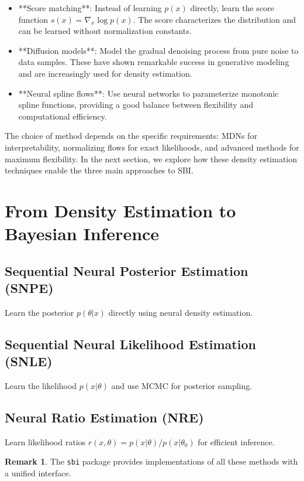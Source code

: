 \documentclass[11pt,a4paper]{article}
\theoremstyle{definition}
\newtheorem*{remark}{Remark}
\begin{document}
\begin{itemize}
    \item **Score matching**: Instead of learning $p(x)$ directly, learn the score function $s(x) = \nabla_x \log p(x)$. The score characterizes the distribution and can be learned without normalization constants.
    
    \item **Diffusion models**: Model the gradual denoising process from pure noise to data samples. These have shown remarkable success in generative modeling and are increasingly used for density estimation.
    
    \item **Neural spline flows**: Use neural networks to parameterize monotonic spline functions, providing a good balance between flexibility and computational efficiency.
\end{itemize}

The choice of method depends on the specific requirements: MDNs for interpretability, normalizing flows for exact likelihoods, and advanced methods for maximum flexibility. In the next section, we explore how these density estimation techniques enable the three main approaches to SBI.

\section{From Density Estimation to Bayesian Inference}

\subsection{Sequential Neural Posterior Estimation (SNPE)}
Learn the posterior $p(\theta|x)$ directly using neural density estimation.

\subsection{Sequential Neural Likelihood Estimation (SNLE)}
Learn the likelihood $p(x|\theta)$ and use MCMC for posterior sampling.

\subsection{Neural Ratio Estimation (NRE)}
Learn likelihood ratios $r(x,\theta) = p(x|\theta) / p(x|\theta_0)$ for efficient inference.

\begin{remark}
The \texttt{sbi} package provides implementations of all these methods with a unified interface.
\end{remark}
\end{document}
